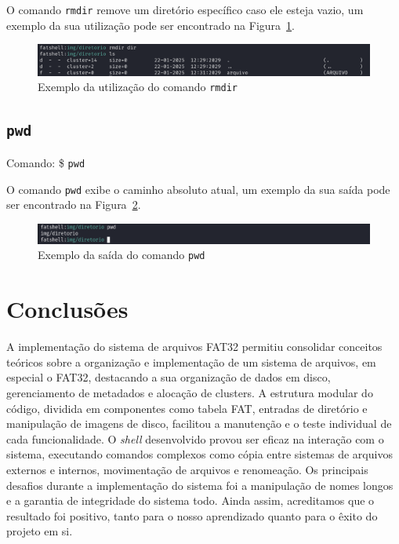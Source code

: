 \documentclass[
    12pt,				%
    oneside,   	        %
    a4paper,			%
    english,			%
    french,				%
    spanish,			%
    brazil,				%
    ]{pacotes/abntex2}
\begin{document}
O comando \texttt{rmdir} remove um diretório específico caso ele esteja vazio, um exemplo da sua utilização pode ser encontrado na Figura~\ref{fig:rmdir}.

\begin{figure}[H]
    \centering
    \includegraphics[width=450pt]{figuras/resultados/17-rmdir.PNG}
    \caption{Exemplo da utilização do comando \texttt{rmdir}}
    \label{fig:rmdir}
\end{figure}


\subsection{\texttt{pwd}}
\label{subsec:pwd}
Comando: \$ \texttt{pwd}

O comando \texttt{pwd} exibe o caminho absoluto atual, um exemplo da sua saída pode ser encontrado na Figura~\ref{fig:pwd}.

\begin{figure}[H]
    \centering
    \includegraphics[width=450pt]{figuras/resultados/19-pwd.PNG}
    \caption{Exemplo da saída do comando \texttt{pwd}}
    \label{fig:pwd}
\end{figure}


\section{Conclusões}
\label{sec:conclusoes}
A implementação do sistema de arquivos FAT32 permitiu consolidar conceitos teóricos sobre a organização e implementação de um sistema de arquivos, em especial o FAT32, destacando a sua organização de dados em disco, gerenciamento de metadados e alocação de clusters. A estrutura modular do código, dividida em componentes como tabela FAT, entradas de diretório e manipulação de imagens de disco, facilitou a manutenção e o teste individual de cada funcionalidade. O \textit{shell} desenvolvido provou ser eficaz na interação com o sistema, executando comandos complexos como cópia entre sistemas de arquivos externos e internos, movimentação de arquivos e renomeação. Os principais desafios durante a implementação do sistema foi a manipulação de nomes longos e a garantia de integridade do sistema todo. Ainda assim, acreditamos que o resultado foi positivo, tanto para o nosso aprendizado quanto para o êxito do projeto em si.
\end{document}
